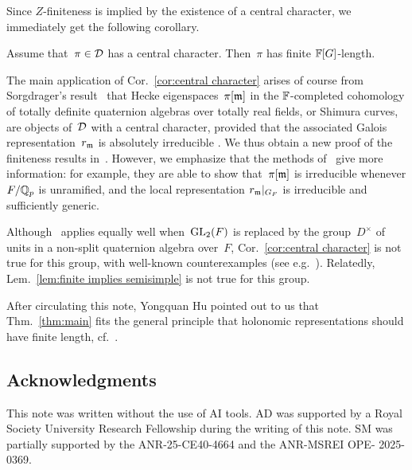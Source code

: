 \documentclass[oneside,a4paper,english, 11pt]{amsart}
\begin{document}
Since $Z$-finiteness is implied by the existence of a central character, we immediately get the following corollary.

\begin{cor}\label{cor:central character}
    Assume that~$\pi \in \mathcal{D}$ has a central character. Then~$\pi$ has finite $\mathbb{F}[G]$-length.
\end{cor}

    The main application of Cor.\ \ref{cor:central character} arises of course from Sorgdrager's result~\cite[Pf.~of Thm.\ 5.3.1]{Sorgdrager-thesis} 
    that Hecke eigenspaces~$\pi[\mathfrak{m}]$ in the $\mathbb{F}$-completed cohomology of totally definite quaternion
    algebras over totally real fields, or Shimura curves, are objects of~$\mathcal{D}$ with a central character, 
    provided that the associated Galois representation~$r_{\mathfrak{m}}$ is absolutely irreducible \cite[Thm.~9.20, Rmk.~9.26]{DPS}. 
    We thus obtain a new proof of the finiteness results in~\cite{BHHMS2, BHHMSFL,Timmins}. 
    However, we emphasize that the methods of~\cite{BHHMS2, BHHMSFL} give more information: for example, they are able to show that~$\pi[\mathfrak{m}]$ is irreducible whenever 
    $F/\mathbb{Q}_p$ is unramified, and
    the local representation $r_{\mathfrak{m}}|_{G_F}$ is irreducible and sufficiently generic.

\begin{rmk}
    Although~\cite[Thm.\ 1.1]{Zhao} applies equally well when~$\mathrm{GL}_2(F)$ is replaced by the group~$D^\times$ of units in a non-split quaternion algebra over~$F$,
    Cor.\ \ref{cor:central character} is not true for this group, with well-known counterexamples (see e.g.\ \cite[Cor.\ 3.2.4]{BD}). 
    Relatedly, Lem.\ \ref{lem:finite implies semisimple} is not true for this group.
\end{rmk}

\begin{rmk}
After circulating this note, Yongquan Hu pointed out to us that Thm.\ \ref{thm:main} fits the general principle that 
holonomic representations should have finite length, cf.\ \cite[Thm.\ 1.3]{Timmins}.
\end{rmk}

\subsection*{Acknowledgments} 
This note was written without the use of AI tools.
AD was supported by a Royal Society University Research Fellowship during the writing of this note. 
SM was partially supported
by the ANR-25-CE40-4664 and the ANR-MSREI OPE-
2025-0369. 
\end{document}
